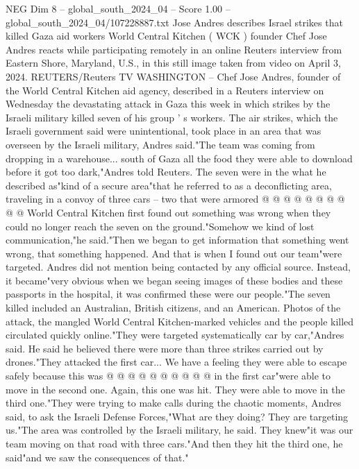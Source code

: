 \begin{textsample}{NEG Dim 8 – global\_south\_2024\_04 – Score 1.00 – global\_south\_2024\_04/107228887.txt}  \label{ex:f8_neg_263}
Jose Andres describes Israel strikes that killed Gaza aid workers World Central Kitchen ( WCK ) founder Chef Jose Andres reacts while participating remotely in an online Reuters interview from Eastern Shore, Maryland, U.S., in this still image taken from video on April 3, 2024.
REUTERS/Reuters TV WASHINGTON -- Chef Jose Andres, founder of the World Central Kitchen aid agency, described in a Reuters interview on Wednesday the devastating attack in Gaza this week in which strikes by the Israeli military killed seven of his group ' s workers.
The air strikes, which the Israeli government said were unintentional, took place in an area that was overseen by the Israeli military, Andres said."The team was coming from dropping in a warehouse... south of Gaza all the food they were able to download before it got too dark,"Andres told Reuters.
The seven were in the what he described as"kind of a secure area"that he referred to as a deconflicting area, traveling in a convoy of three cars -- two that were armored @ @ @ @ @ @ @ @ @ @ World Central Kitchen first found out something was wrong when they could no longer reach the seven on the ground."Somehow we kind of lost communication,"he said."Then we began to get information that something went wrong, that something happened.
And that is when I found out our team"were targeted.
Andres did not mention being contacted by any official source.
Instead, it became"very obvious when we began seeing images of these bodies and these passports in the hospital, it was confirmed these were our people."The seven killed included an Australian, British citizens, and an American.
Photos of the attack, the mangled World Central Kitchen-marked vehicles and the people killed circulated quickly online."They were targeted systematically car by car,"Andres said.
He said he believed there were more than three strikes carried out by drones."They attacked the first car...
We have a feeling they were able to escape safely because this was @ @ @ @ @ @ @ @ @ @ in the first car"were able to move in the second one.
Again, this one was hit.
They were able to move in the third one."They were trying to make calls during the chaotic moments, Andres said, to ask the Israeli Defense Forces,"What are they doing?
They are targeting us."The area was controlled by the Israeli military, he said.
They knew"it was our team moving on that road with three cars."And then they hit the third one, he said"and we saw the consequences of that."

\end{textsample}

